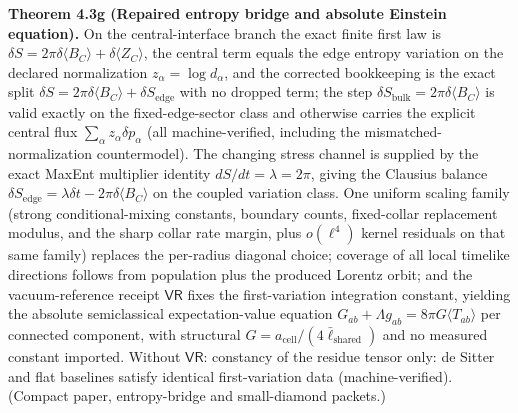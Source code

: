 \textbf{Theorem 4.3g (Repaired entropy bridge and absolute Einstein equation).} On the central-interface branch the exact finite first law is \(\delta S=2\pi\delta\langle B_C\rangle+\delta\langle Z_C\rangle\), the central term equals the edge entropy variation on the declared normalization \(z_\alpha=\log d_\alpha\), and the corrected bookkeeping is the exact split \(\delta S=2\pi\delta\langle B_C\rangle+\delta S_{\mathrm{edge}}\) with no dropped term; the step \(\delta S_{\mathrm{bulk}}=2\pi\delta\langle B_C\rangle\) is valid exactly on the fixed-edge-sector class and otherwise carries the explicit central flux \(\sum_\alpha z_\alpha\delta p_\alpha\) (all machine-verified, including the mismatched-normalization countermodel). The changing stress channel is supplied by the exact MaxEnt multiplier identity \(dS/dt=\lambda=2\pi\), giving the Clausius balance \(\delta S_{\mathrm{edge}}=\lambda\delta t-2\pi\delta\langle B_C\rangle\) on the coupled variation class. One uniform scaling family (strong conditional-mixing constants, boundary counts, fixed-collar replacement modulus, and the sharp collar rate margin, plus \(o(\ell^4)\) kernel residuals on that same family) replaces the per-radius diagonal choice; coverage of all local timelike directions follows from population plus the produced Lorentz orbit; and the vacuum-reference receipt \(\mathsf{VR}\) fixes the first-variation integration constant, yielding the absolute semiclassical expectation-value equation \(G_{ab}+\Lambda g_{ab}=8\pi G\langle T_{ab}\rangle\) per connected component, with structural \(G=a_{\mathrm{cell}}/(4\bar\ell_{\mathrm{shared}})\) and no measured constant imported. Without \(\mathsf{VR}\): constancy of the residue tensor only: de Sitter and flat baselines satisfy identical first-variation data (machine-verified). (Compact paper, entropy-bridge and small-diamond packets.)

